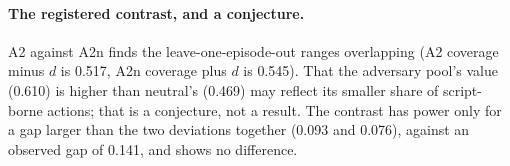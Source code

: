 \documentclass[11pt]{article}
\begin{document}
\begin{table}[h]
\centering\small

\caption{Study 4 against its registered predictions.}
\label{tab:study4}
\end{table}

\paragraph{The registered contrast, and a conjecture.} A2 against A2n finds the
leave-one-episode-out ranges overlapping (A2 coverage minus $d$ is 0.517, A2n coverage plus
$d$ is 0.545). That the adversary pool's value (0.610) is higher than neutral's (0.469) may
reflect its smaller share of script-borne actions; that is a conjecture, not a result. The
contrast has power only for a gap larger than the two deviations together (0.093 and
0.076), against an observed gap of 0.141, and shows no difference.
\end{document}
